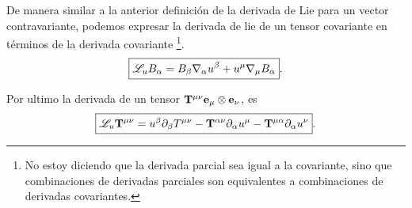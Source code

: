 \noindent De manera similar a la anterior definición de la derivada de Lie para un vector contravariante, podemos expresar la derivada de lie de un tensor covariante en términos de la derivada covariante \footnote{No estoy diciendo que la derivada parcial sea igual a la covariante, sino que combinaciones de derivadas parciales son equivalentes a combinaciones de derivadas covariantes.}.
\begin{equation}
    \boxed{\mathscr{L}_u B_\alpha=B_\beta \mathbf{\nabla}_\alpha u^\beta+u^\mu \mathbf{\nabla}_\mu B_\alpha}.
\end{equation}


\noindent Por ultimo la derivada de un tensor ${\mathbf{T}}^{\mu \nu} \mathbf{e_\mu} \otimes \mathbf{e_\nu}$, es 
\begin{equation}
    \boxed{\mathscr{L}_u {\mathbf{T}}^{\mu \nu} = u^\beta \partial_\beta T^{\mu \nu}   -  {\mathbf{T}}^{\alpha \nu} \partial_\alpha u^\mu  -{\mathbf{T}}^{\mu \alpha} \partial_\alpha u^\nu}.
\end{equation}

